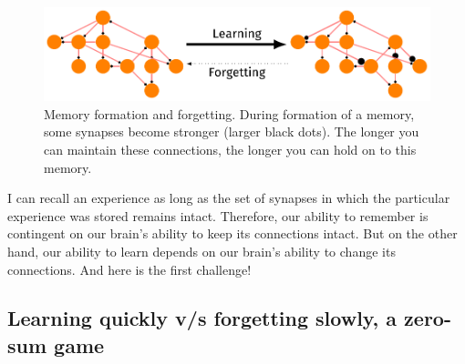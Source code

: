 \documentclass[]{resonance}
\begin{document}
\begin{figure}[hb] 
    \centering
    \caption{Memory formation and forgetting. During formation of
        a memory, some synapses become stronger (larger black dots). 
        The longer you can maintain these connections, the longer you 
        can hold on to this memory.
    }\label{fig:engram}
    \includegraphics[width=0.8\linewidth]{figures/engram.pdf} 
\end{figure}

I can recall an experience as long as the set of synapses in which the
particular experience was stored remains intact. Therefore, our ability to
remember is contingent on our brain's ability to keep its connections intact.
But on the other hand, our ability to learn depends on our brain's ability to
change its connections. And here is the first challenge!

\subsection{Learning quickly v/s forgetting slowly, a zero-sum game}\label{subsec:zero_sum} 
\end{document}
